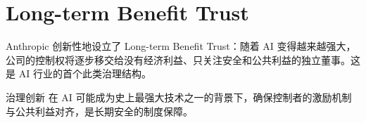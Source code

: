 \section{Long-term Benefit Trust}

Anthropic 创新性地设立了 Long-term Benefit Trust：随着 AI 变得越来越强大，公司的控制权将逐步移交给没有经济利益、只关注安全和公共利益的独立董事。这是 AI 行业的首个此类治理结构。

\begin{importantbox}{治理创新}
在 AI 可能成为史上最强大技术之一的背景下，确保控制者的激励机制与公共利益对齐，是长期安全的制度保障。
\end{importantbox}

